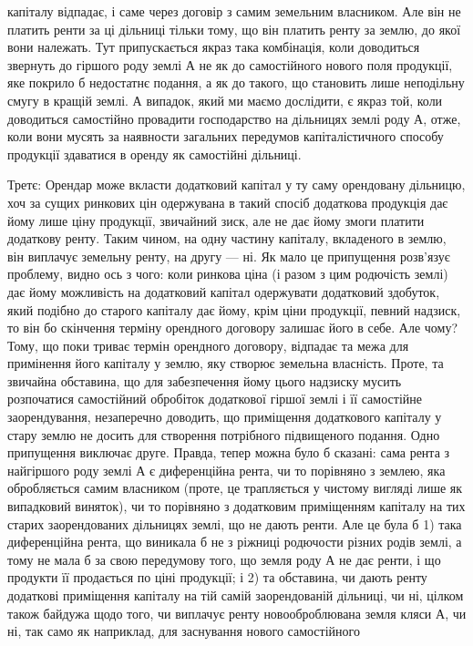 капіталу відпадає, і саме через договір з самим земельним власником. Але він не платить
ренти за ці дільниці тільки тому, що він платить ренту за землю, до
якої вони належать. Тут припускається якраз така комбінація, коли доводиться
звернуть до гіршого роду землі А не як до самостійного нового поля продукції,
яке покрило б недостатнє подання, а як до такого, що становить лише
неподільну смугу в кращій землі. А випадок, який ми маємо дослідити, є якраз той,
коли доводиться самостійно провадити господарство на дільницях землі роду А,
отже, коли вони мусять за наявности загальних передумов капіталістичного способу
продукції здаватися в оренду як самостійні дільниці.

Третє: Орендар може вкласти додатковий капітал у ту саму орендовану
дільницю, хоч за сущих ринкових цін одержувана в такий спосіб додаткова
продукція дає йому лише ціну продукції, звичайний зиск, але не дає йому
змоги платити додаткову ренту. Таким чином, на одну частину капіталу, вкладеного
в землю, він виплачує земельну ренту, на другу — ні. Як мало це припущення
розв’язує проблему, видно ось з чого: коли ринкова ціна (і разом
з цим родючість землі) дає йому можливість на додатковий капітал одержувати
додатковий здобуток, який подібно до старого капіталу дає йому, крім ціни продукції,
певний надзиск, то він бо скінчення терміну орендного договору залишає
його в себе. Але чому? Тому, що поки триває термін орендного договору, відпадає
та межа для примінення його капіталу у землю, яку створює земельна
власність. Проте, та звичайна обставина, що для забезпечення йому цього надзиску
мусить розпочатися самостійний обробіток додаткової гіршої землі і її самостійне
заорендування, незаперечно доводить, що приміщення додаткового капіталу
у стару землю не досить для створення потрібного підвищеного подання.
Одно припущення виключає друге. Правда, тепер можна було б сказані: сама
рента з найгіршого роду землі А є диференційна рента, чи то порівняно з землею,
яка обробляється самим власником (проте, це трапляється у чистому вигляді
лише як випадковий виняток), чи то порівняно з додатковим приміщенням
капіталу на тих старих заорендованих дільницях землі, що не дають ренти.
Але це була б 1) така диференційна рента, що виникала б не з ріжниці родючости
різних родів землі, а тому не мала б за свою передумову того, що земля
роду А не дає ренти, і що продукти її продається по ціні продукції; і 2) та обставина,
чи дають ренту додаткові приміщення капіталу на тій самій заорендованій
дільниці, чи ні, цілком також байдужа щодо того, чи виплачує ренту новооброблювана
земля кляси А, чи ні, так само як наприклад, для заснування нового самостійного

